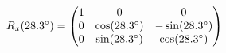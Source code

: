 \documentclass[preview]{standalone}
\begin{document}
\begin{align*}
\special{dvisvgm:raw <g id='unique000'>}R_x(28.3^\circ) = \begin{pmatrix} 1 & 0 & 0 \\ 0 & \cos(28.3^\circ) & -\sin(28.3^\circ) \\ 0 & \sin(28.3^\circ) & \cos(28.3^\circ) \end{pmatrix}\special{dvisvgm:raw </g>}
\end{align*}
\end{document}
